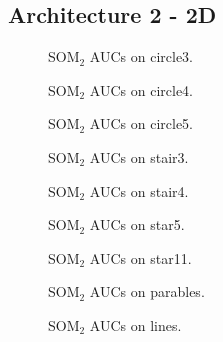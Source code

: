 \subsection{Architecture 2 - 2D}
\begin{figure}[h!]
         \centering
         
         \caption{SOM$_2$ AUCs on circle3.}
\end{figure}
\begin{figure}[h!]
         \centering
         
         \caption{SOM$_2$ AUCs on circle4.}
\end{figure}
\begin{figure}[h!]
         \centering
         
         \caption{SOM$_2$ AUCs on circle5.}
\end{figure}
\begin{figure}[h!]
         \centering
         
         \caption{SOM$_2$ AUCs on stair3.}
\end{figure}
\begin{figure}[h!]
         \centering
         
         \caption{SOM$_2$ AUCs on stair4.}
\end{figure}
\begin{figure}[h!]
         \centering
         
         \caption{SOM$_2$ AUCs on star5.}
\end{figure}
\begin{figure}[h!]
         \centering
         
         \caption{SOM$_2$ AUCs on star11.}
\end{figure}
\begin{figure}[h!]
         \centering
         
         \caption{SOM$_2$ AUCs on parables.}
\end{figure}
\begin{figure}[h!]
         \centering
         
         \caption{SOM$_2$ AUCs on lines.}
\end{figure}
\clearpage


